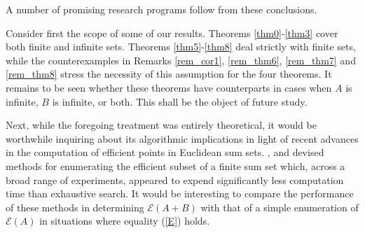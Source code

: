 \documentclass[pdflatex,sn-apa,11pt]{sn-jnl}%
\begin{document}

A number of promising research programs follow from these conclusions.

Consider first the scope of some of our results. Theorems \ref{thm0}-\ref{thm3} cover both finite and infinite sets. Theorems \ref{thm5}-\ref{thm8} deal strictly with finite sets, while the counterexamples in Remarks \ref{rem_cor1}, \ref{rem_thm6}, \ref{rem_thm7} and \ref{rem_thm8} stress the necessity of this assumption for the four theorems. It remains to be seen whether these theorems have counterparts in cases when $A$ is infinite, $B$ is infinite, or both. This shall be the object of future study.

Next, while the foregoing treatment was entirely theoretical, it would be worthwhile inquiring about its algorithmic implications in light of recent advances in the computation of efficient points in Euclidean sum sets.  \cite{kerberenes2023computing}, \cite{klamroth2024efficient} and \cite{funke2025pareto} devised methods for enumerating the efficient subset of a finite sum set which, across a broad range of experiments, appeared to expend significantly less computation time than exhaustive search. It would be interesting to compare the performance of these methods in determining $\mathscr{E}(A+B)$ with that of a simple enumeration of $\mathscr{E}(A)$ in situations where equality (\ref{E}) holds.  
\end{document}
